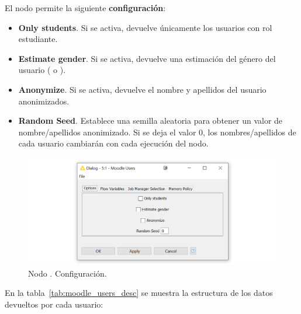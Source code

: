 El nodo permite la siguiente \textbf{configuración}: 

\begin{itemize}
   \item \textbf{Only students}. Si se activa, devuelve únicamente los usuarios con rol estudiante. 
   \item \textbf{Estimate gender}. Si se activa, devuelve una estimación del género del usuario ( o ). 
   \item \textbf{Anonymize}. Si se activa, devuelve el nombre y apellidos del usuario anonimizados.  
   \item \textbf{Random Seed}. Establece una semilla aleatoria para obtener un valor de nombre/apellidos anonimizado. 
   Si se deja el valor 0, los nombres/apellidos de cada usuario cambiarán con cada ejecución del nodo. 
\end{itemize}

\begin{figure}[!h]
	\centering
	\includegraphics[width=1\textwidth]{img/nodes_moodle_users_settings.png}
	\caption{Nodo . Configuración.}
	\label{fig:moodleusers_settings}
\end{figure}
\FloatBarrier


En la tabla~\ref{tab:moodle_users_desc} se muestra la estructura de los datos devueltos por cada usuario: 

